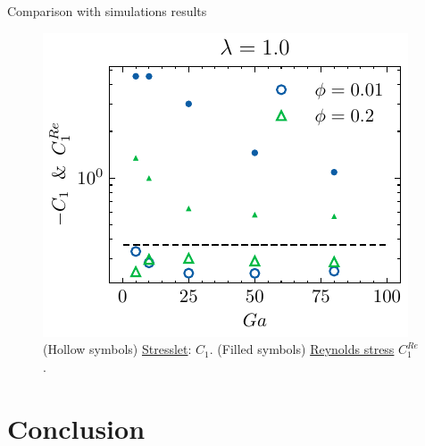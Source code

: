 \documentclass{sintefbeamer}
\begin{document}
\begin{frame}{Comparison with simulations results}
  \begin{figure}[h!]
    \centering
    \includegraphics[height = 0.25\textwidth]{image/HOMOGENEOUS_final/PA/Sdev_diapo_l_10.pdf}
    \caption{
      (Hollow symbols) \underline{Stresslet}: $C_1$. 
      (Filled symbols) \underline{Reynolds stress} $C_1^{Re}$. 
     }
\end{figure}



\end{frame}



\section{Conclusion}
\section*{}
\end{document}

